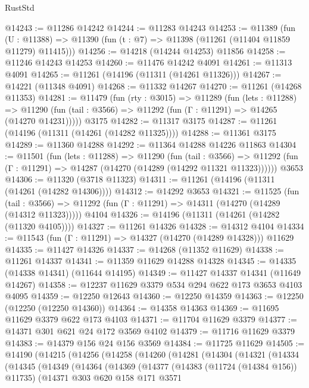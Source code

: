 \begin{lexlean}{RustStd}
\begin{coremodule}
@14243 := @11286 @14242
@14244 := @11283 @14243
@14253 := @11389
    (fun (U : @11388) => @11390 (fun (t : @7) => @11398 (@11261 (@11404 @11859 @11279) @11415)))
@14256 := @14218 (@14244 @14253) @11856
@14258 := @11246 @14243 @14253
@14260 := @11476 @14242 @4091
@14261 := @11313 @4091
@14265 := @11261 (@14196 (@11311 (@14261 @11326)))
@14267 := @14221 (@11348 @4091)
@14268 := @11332 @14267
@14270 := @11261 (@14268 @11353)
@14281 := @11479
    (fun (rty : @3015) =>
    @11289
      (fun (lets : @11288) =>
      @11290 (fun (tail : @3566) => @11292 (fun (Γ : @11291) => @14265 (@14270 @14231)))))
    @3175
@14282 := @11317 @3175
@14287 := @11261 (@14196 (@11311 (@14261 (@14282 @11325))))
@14288 := @11361 @3175
@14289 := @11360 @14288
@14292 := @11364 @14288 @14226 @11863
@14304 := @11501
    (fun (lets : @11288) =>
    @11290
      (fun (tail : @3566) =>
      @11292 (fun (Γ : @11291) => @14287 (@14270 (@14289 (@14292 @11321 @11323))))))
    @3653
@14306 := @11320 (@3718 @11323)
@14311 := @11261 (@14196 (@11311 (@14261 (@14282 @14306))))
@14312 := @14292 @3653
@14321 := @11525
    (fun (tail : @3566) => @11292 (fun (Γ : @11291) => @14311 (@14270 (@14289 (@14312 @11323)))))
    @4104
@14326 := @14196 (@11311 (@14261 (@14282 (@11320 @4105))))
@14327 := @11261 @14326
@14328 := @14312 @4104
@14334 := @11543 (fun (Γ : @11291) => @14327 (@14270 (@14289 @14328))) @11629
@14335 := @11427 @14326
@14337 := @14268 (@11352 @11629)
@14338 := @11261 @14337
@14341 := @11359 @11629 @14288 @14328
@14345 := @14335 (@14338 @14341) (@11644 @14195)
@14349 := @11427 @14337 @14341 (@11649 @14267)
@14358 := @12237 @11629 @3379 @534 @294 @622 @173 @3653 @4103 @4095
@14359 := @12250 @12643
@14360 := @12250 @14359
@14363 := @12250 (@12250 (@12250 @14360))
@14364 := @14358 @14363
@14369 := @11695 @11629 @3379 @622 @173 @4103
@14371 := @11704 @11629 @3379
@14377 := @14371 @301 @621 @24 @172 @3569 @4102
@14379 := @11716 @11629 @3379
@14383 := @14379 @156 @24 @156 @3569
@14384 := @11725 @11629
@14505 := @14190
    (@14215
      (@14256
        (@14258
          (@14260
            (@14281
              (@14304
                (@14321
                  (@14334
                    (@14345
                      (@14349
                        (@14364
                          (@14369
                            (@14377
                              (@14383 (@11724 (@14384 @156)) @11735)
                              (@14371
                                @303
                                @620
                                @158
                                @171
                                @3571

\end{coremodule}
\end{lexlean}
